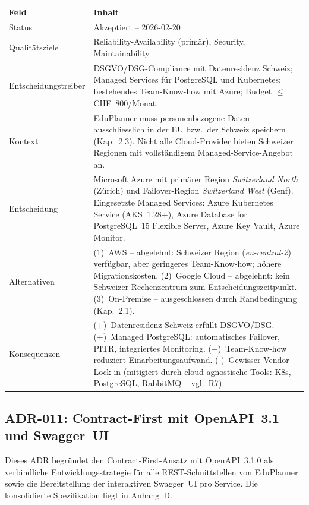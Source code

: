 \begin{tabularx}{\textwidth}{L{3.5cm} X}
  \color{white}\textbf{Feld} & \color{white}\textbf{Inhalt} \\
  Status & Akzeptiert -- 2026-02-20 \\
  Qualitätsziele & Reliability-Availability (primär), Security, Maintainability \\
  Entscheidungstreiber & DSGVO/DSG-Compliance mit Datenresidenz Schweiz; Managed Services für PostgreSQL und Kubernetes; bestehendes Team-Know-how mit Azure; Budget $\leq$ CHF~800/Monat. \\
  Kontext & EduPlanner muss personenbezogene Daten ausschliesslich in der EU bzw.\ der Schweiz speichern (Kap.~2.3). Nicht alle Cloud-Provider bieten Schweizer Regionen mit vollständigem Managed-Service-Angebot an. \\
  Entscheidung & Microsoft Azure mit primärer Region \textit{Switzerland North} (Zürich) und Failover-Region \textit{Switzerland West} (Genf). Eingesetzte Managed Services: Azure Kubernetes Service (AKS~1.28+), Azure Database for PostgreSQL~15 Flexible Server, Azure Key Vault, Azure Monitor. \\
  Alternativen & (1)~AWS -- abgelehnt: Schweizer Region (\textit{eu-central-2}) verfügbar, aber geringeres Team-Know-how; höhere Migrationskosten. (2)~Google Cloud -- abgelehnt: kein Schweizer Rechenzentrum zum Entscheidungszeitpunkt. (3)~On-Premise -- ausgeschlossen durch Randbedingung (Kap.~2.1). \\
  Konsequenzen & (+)~Datenresidenz Schweiz erfüllt DSGVO/DSG. (+)~Managed PostgreSQL: automatisches Failover, PITR, integriertes Monitoring. (+)~Team-Know-how reduziert Einarbeitungsaufwand. (-)~Gewisser Vendor Lock-in (mitigiert durch cloud-agnostische Tools: K8s, PostgreSQL, RabbitMQ -- vgl.\ R7). \\
\end{tabularx}

\subsection{ADR-011: Contract-First mit OpenAPI~3.1 und Swagger~UI}

Dieses ADR begründet den Contract-First-Ansatz mit OpenAPI~3.1.0 als
verbindliche Entwicklungsstrategie für alle REST-Schnittstellen von
EduPlanner sowie die Bereitstellung der interaktiven Swagger~UI pro Service.
Die konsolidierte Spezifikation liegt in Anhang~D.

